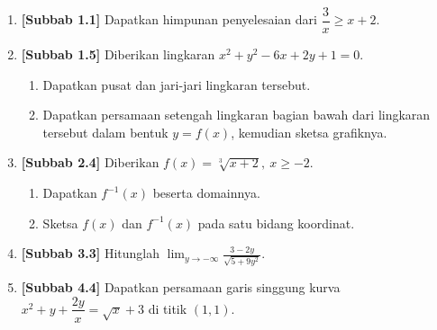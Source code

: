 \documentclass[10pt,openany,a4paper]{article}
\theoremstyle{definition}
\theoremstyle{definition}
\theoremstyle{plain}
\begin{document}
\begin{enumerate}
    \item \textbf{[Subbab 1.1]} Dapatkan himpunan penyelesaian dari $\dfrac{3}{x}\geq x+2$.

    \item \textbf{[Subbab 1.5]} Diberikan lingkaran $x^2+y^2-6x+2y+1=0$.
    \begin{enumerate}
        \item Dapatkan pusat dan jari-jari lingkaran tersebut.
        \item Dapatkan persamaan setengah lingkaran bagian bawah dari lingkaran tersebut dalam bentuk $y=f(x)$, kemudian sketsa grafiknya.
    \end{enumerate}

    \item \textbf{[Subbab 2.4]} Diberikan $f(x)=\sqrt[3]{x+2},\ x\geq -2$.
    \begin{enumerate}
        \item Dapatkan $f^{-1}(x)$ beserta domainnya.
        \item Sketsa $f(x)$ dan $f^{-1}(x)$ pada satu bidang koordinat.
    \end{enumerate}

    \item \textbf{[Subbab 3.3]} Hitunglah $\displaystyle\lim_{y\to-\infty}\frac{3-2y}{\sqrt{5+9y^2}}$.

    \item \textbf{[Subbab 4.4]} Dapatkan persamaan garis singgung kurva $x^2+y+\dfrac{2y}{x}=\sqrt{x}+3$ di titik $(1,1)$.
\end{enumerate}

\newpage
\end{document}
